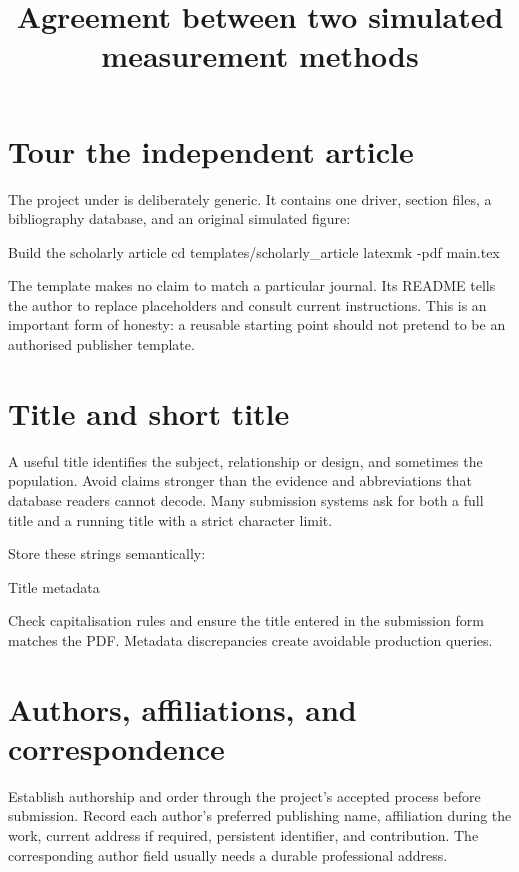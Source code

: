 \section{Tour the independent article}

The project under  is deliberately generic.
It contains one driver, section files, a bibliography database, and an original
simulated figure:

\begin{terminalcode}{Build the scholarly article}
cd templates/scholarly_article
latexmk -pdf main.tex
\end{terminalcode}

The template makes no claim to match a particular journal. Its README tells the
author to replace placeholders and consult current instructions. This is an
important form of honesty: a reusable starting point should not pretend to be
an authorised publisher template.

\section{Title and short title}

A useful title identifies the subject, relationship or design, and sometimes
the population. Avoid claims stronger than the evidence and abbreviations that
database readers cannot decode. Many submission systems ask for both a full
title and a running title with a strict character limit.

Store these strings semantically:

\begin{latexcode}{Title metadata}
\newcommand{\manuscripttitle}{Agreement between two
simulated measurement methods}
\newcommand{\shorttitle}{Simulated method agreement}
\title{\manuscripttitle}
\end{latexcode}

Check capitalisation rules and ensure the title entered in the submission form
matches the PDF. Metadata discrepancies create avoidable production queries.

\section{Authors, affiliations, and correspondence}

Establish authorship and order through the project's accepted process before
submission. Record each author's preferred publishing name, affiliation during
the work, current address if required, persistent identifier, and contribution.
The corresponding author field usually needs a durable professional address.

